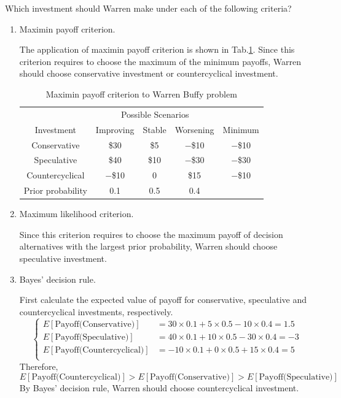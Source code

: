\documentclass[a4paper]{article}
\begin{document}
\begin{enumerate}
  \hspace*{4ex}Which investment should Warren make under each of the following criteria?
  \begin{enumerate}
\item Maximin payoff criterion.
\begin{solution}
The application of maximin payoff criterion is shown in Tab.\ref{tabmpc}. Since this criterion requires to choose the maximum of the minimum payoffs, Warren should choose conservative investment or countercyclical investment.
\begin{table}[h]
  	\centering
  	\caption{Maximin payoff criterion to Warren Buffy problem}
  	\label{tabmpc}
  	\begin{tabular}{ccccc}
  		\toprule[1.5pt]
  		&\multicolumn{3}{c}{Possible Scenarios}&\\
  		\cmidrule{2-4}
  		Investment&Improving&Stable&Worsening&Minimum\\
  		\midrule
		Conservative&\$30 &\$5 &$-$\$10&$-$\$10 \\
		Speculative&\$40 &\$10 &$-$\$30&$-$\$30 \\
		Countercyclical&$-$\$10 &0&\$15&$-$\$10 \\
		\midrule
		Prior probability&0.1&0.5&0.4&\\
  		\bottomrule[1.5pt]
  	\end{tabular}
  \end{table}
\end{solution}

\item Maximum likelihood criterion.
\begin{solution}

	Since this criterion requires to choose the maximum payoff of decision alternatives with the largest prior probability, Warren should choose speculative investment.

\end{solution}

\item Bayes' decision rule.
\begin{solution}
First calculate the expected value of payoff for conservative, speculative and countercyclical investments, respectively.
\begin{equation*}\left\{
\begin{aligned}
E[\text{Payoff(Conservative)}]&=30\times0.1+5\times0.5-10\times0.4=1.5\\
E[\text{Payoff(Speculative)}]&=40\times0.1+10\times0.5-30\times0.4=-3\\
E[\text{Payoff(Countercyclical)}]&=-10\times0.1+0\times0.5+15\times0.4=5\\	
\end{aligned}\right.
\end{equation*}
Therefore,
$$
E[\text{Payoff(Countercyclical)}]>E[\text{Payoff(Conservative)}]>E[\text{Payoff(Speculative)}]
$$
By Bayes' decision rule, Warren should choose countercyclical investment.
\end{solution}
\end{enumerate}


\end{enumerate}
\end{document}
